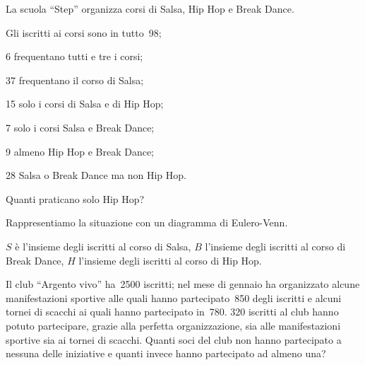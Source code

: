 \begin{esercizio}
\label{ese:7.25}
La scuola ``Step'' organizza corsi di Salsa, Hip Hop e Break Dance.

\begin{multicols}{2}
\begin{enumeratea}
\item Gli iscritti ai corsi sono in tutto~98;
\item 6 frequentano tutti e tre i corsi;
\item 37 frequentano il corso di Salsa;
\item 15 solo i corsi di Salsa e di Hip Hop;
\item 7 solo i corsi Salsa e Break Dance;
\item 9 almeno Hip Hop e Break Dance;
\item 28 Salsa o Break Dance ma non Hip Hop.
\end{enumeratea}
\end{multicols}

Quanti praticano solo Hip Hop?

Rappresentiamo la situazione con un diagramma di Eulero-Venn.
\begin{center}
 
\end{center}
$S$ è l'insieme degli iscritti al corso di Salsa, $B$ l'insieme degli iscritti 
al corso di
Break Dance, $H$ l'insieme degli iscritti al corso di Hip Hop.
\end{esercizio}

\begin{esercizio}
\label{ese:7.26}
Il club ``Argento vivo'' ha~2500 iscritti; nel mese di gennaio ha organizzato 
alcune
manifestazioni sportive alle quali hanno partecipato~850 degli iscritti
e alcuni tornei di scacchi ai quali hanno partecipato in~780. 320
iscritti al club hanno potuto partecipare, grazie alla perfetta
organizzazione, sia alle manifestazioni sportive sia ai tornei di
scacchi. Quanti soci del club non hanno partecipato a nessuna delle
iniziative e quanti invece hanno partecipato ad almeno una?
\end{esercizio}

